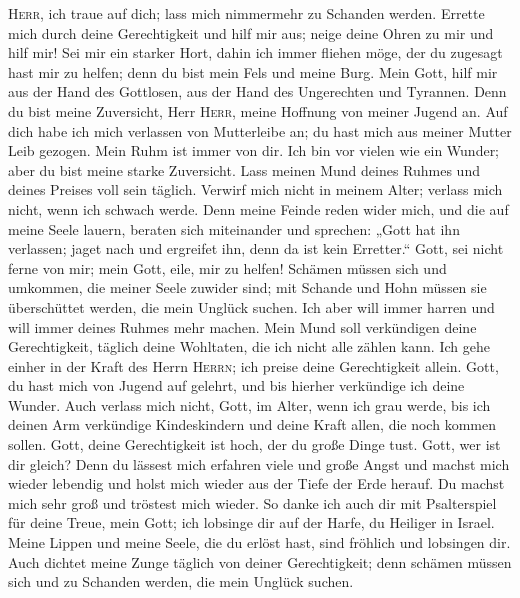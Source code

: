  \textsc{Herr}, ich traue auf dich; lass mich nimmermehr
zu Schanden werden.  Errette mich durch deine
Gerechtigkeit und hilf mir aus; neige deine Ohren zu mir und hilf mir!
 Sei mir ein starker Hort, dahin ich immer fliehen möge,
der du zugesagt hast mir zu helfen; denn du bist mein Fels und meine
Burg.  Mein Gott, hilf mir aus der Hand des Gottlosen, aus
der Hand des Ungerechten und Tyrannen.  Denn du bist meine
Zuversicht, Herr \textsc{Herr}, meine Hoffnung von meiner Jugend an.
 Auf dich habe ich mich verlassen von Mutterleibe an; du
hast mich aus meiner Mutter Leib gezogen. Mein Ruhm ist immer von dir.
 Ich bin vor vielen wie ein Wunder; aber du bist meine
starke Zuversicht.  Lass meinen Mund deines Ruhmes und
deines Preises voll sein täglich.  Verwirf mich nicht in
meinem Alter; verlass mich nicht, wenn ich schwach werde.
 Denn meine Feinde reden wider mich, und die auf meine
Seele lauern, beraten sich miteinander  und sprechen:
„Gott hat ihn verlassen; jaget nach und ergreifet ihn, denn da ist kein
Erretter.``  Gott, sei nicht ferne von mir; mein Gott,
eile, mir zu helfen!  Schämen müssen sich und umkommen,
die meiner Seele zuwider sind; mit Schande und Hohn müssen sie
überschüttet werden, die mein Unglück suchen.  Ich aber
will immer harren und will immer deines Ruhmes mehr machen.
 Mein Mund soll verkündigen deine Gerechtigkeit, täglich
deine Wohltaten, die ich nicht alle zählen kann.  Ich
gehe einher in der Kraft des Herrn \textsc{Herrn}; ich preise deine
Gerechtigkeit allein.  Gott, du hast mich von Jugend auf
gelehrt, und bis hierher verkündige ich deine Wunder. 
Auch verlass mich nicht, Gott, im Alter, wenn ich grau werde, bis ich
deinen Arm verkündige Kindeskindern und deine Kraft allen, die noch
kommen sollen.  Gott, deine Gerechtigkeit ist hoch, der
du große Dinge tust. Gott, wer ist dir gleich?  Denn du
lässest mich erfahren viele und große Angst und machst mich wieder
lebendig und holst mich wieder aus der Tiefe der Erde herauf.
 Du machst mich sehr groß und tröstest mich wieder.
 So danke ich auch dir mit Psalterspiel für deine Treue,
mein Gott; ich lobsinge dir auf der Harfe, du Heiliger in Israel.
 Meine Lippen und meine Seele, die du erlöst hast, sind
fröhlich und lobsingen dir.  Auch dichtet meine Zunge
täglich von deiner Gerechtigkeit; denn schämen müssen sich und zu
Schanden werden, die mein Unglück suchen.

